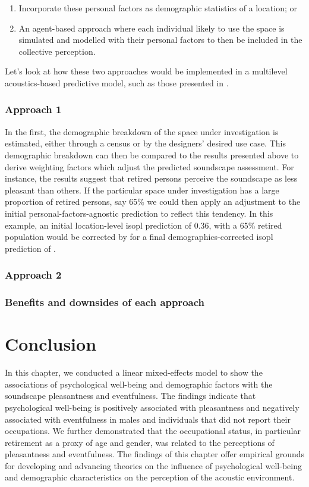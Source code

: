 \begin{enumerate}
  \item Incorporate these personal factors as demographic statistics of a location; or
  \item An agent-based approach where each individual likely to use the space is simulated and modelled with their personal factors to then be included in the collective perception.
\end{enumerate}

Let's look at how these two approaches would be implemented in a multilevel acoustics-based predictive model, such as those presented in .

\subsubsection{Approach 1}
In the first, the demographic breakdown of the space under investigation is estimated, either through a census or by the designers' desired use case. This demographic breakdown can then be compared to the results presented above \citep{Erfanian2021Psychological} to derive weighting factors which adjust the predicted soundscape assessment. For instance, the results suggest that retired persons perceive the soundscape as  less pleasant than others. If the particular space under investigation has a large proportion of retired persons, say 65\% we could then apply an adjustment to the initial personal-factors-agnostic prediction to reflect this tendency. In this example, an initial location-level \gls{isopl} prediction of 0.36, with a 65\% retired population would be corrected by  for a final demographics-corrected \gls{isopl} prediction of .

\subsubsection{Approach 2}

\subsubsection{Benefits and downsides of each approach}

\section{Conclusion}

In this chapter, we conducted a linear mixed-effects model to show the associations of psychological well-being and demographic factors with the soundscape pleasantness and eventfulness. The findings indicate that psychological well-being is positively associated with pleasantness and negatively associated with eventfulness in males and individuals that did not report their occupations. We further demonstrated that the occupational status, in particular retirement as a proxy of age and gender, was related to the perceptions of pleasantness and eventfulness. The findings of this chapter offer empirical grounds for developing and advancing theories on the influence of psychological well-being and demographic characteristics on the perception of the acoustic environment. 